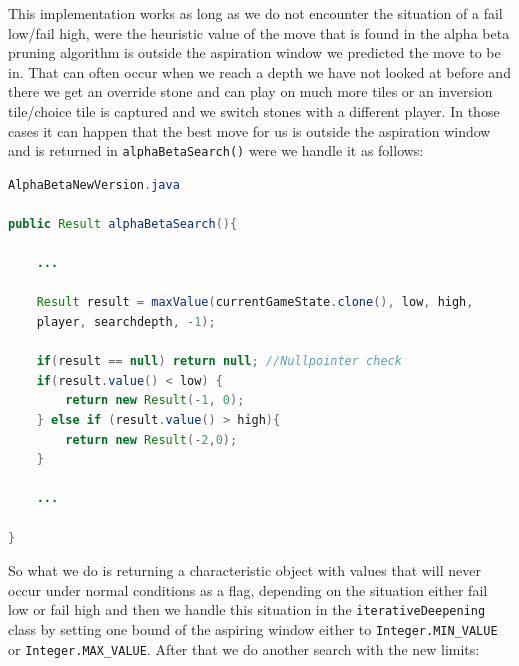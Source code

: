 \noindent This implementation works as long as we do not encounter the situation of a fail low/fail high, were the heuristic value of the move that is found in the alpha beta pruning algorithm is outside the aspiration window we predicted the move to be in. That can often occur when we reach a depth we have not looked at before and there we get an override stone and can play on much more tiles or an inversion tile/choice tile is captured and we switch stones with a different player. In those cases it can happen that the best move for us is outside the aspiration window and is returned in \texttt{alphaBetaSearch()} were we handle it as follows:

\begin{lstlisting}[language=Java, basicstyle=\ttfamily\small]
AlphaBetaNewVersion.java

public Result alphaBetaSearch(){

    ...
        
    Result result = maxValue(currentGameState.clone(), low, high, 
    player, searchdepth, -1);

    if(result == null) return null; //Nullpointer check
    if(result.value() < low) {
        return new Result(-1, 0);
    } else if (result.value() > high){
        return new Result(-2,0);
    }
        
    ...
        
}
\end{lstlisting}

\noindent So what we do is returning a characteristic  object with values that will never occur under normal conditions as a flag, depending on the situation either fail low or fail high and then we handle this situation in the \texttt{iterativeDeepening} class by setting one bound of the aspiring window either to \texttt{Integer.MIN\_VALUE} or \texttt{Integer.MAX\_VALUE}. After that we do another search with the new limits:

